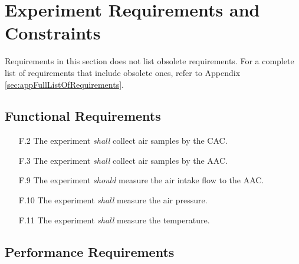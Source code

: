 \documentclass[a4paper,12pt,oneside]{article} %
\begin{document}
\pagebreak
\section{Experiment Requirements and Constraints}
Requirements in this section does not list obsolete requirements. For a complete list of requirements that include obsolete ones, refer to Appendix \ref{sec:appFullListOfRequirements}.

\subsection{Functional Requirements}

\begin{enumerate}
    \item[F.2] The experiment \textit{shall} collect air samples by the CAC.
    \item[F.3] The experiment \textit{shall} collect air samples by the AAC.
    \item[F.9] The experiment \textit{should} measure the air intake flow to the AAC.
    \item[F.10] The experiment \textit{shall} measure the air pressure.
    \item[F.11] The experiment \textit{shall} measure the temperature.
\end{enumerate}
\subsection{Performance Requirements}
\end{document}
